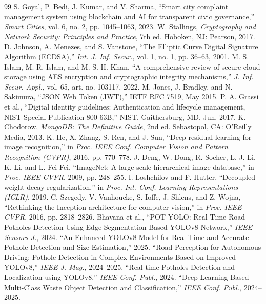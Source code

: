 \documentclass[conference]{IEEEtran}
\begin{document}
\begin{thebibliography}{99}
 S. Goyal, P. Bedi, J. Kumar, and V. Sharma, ``Smart city complaint management system using blockchain and AI for transparent civic governance,'' \emph{Smart Cities}, vol. 6, no. 2, pp. 1045--1063, 2023.
 W. Stallings, \emph{Cryptography and Network Security: Principles and Practice}, 7th ed. Hoboken, NJ: Pearson, 2017.
 D. Johnson, A. Menezes, and S. Vanstone, ``The Elliptic Curve Digital Signature Algorithm (ECDSA),'' \emph{Int. J. Inf. Secur.}, vol. 1, no. 1, pp. 36--63, 2001.
 M. S. Islam, M. R. Islam, and M. S. H. Khan, ``A comprehensive review of secure cloud storage using AES encryption and cryptographic integrity mechanisms,'' \emph{J. Inf. Secur. Appl.}, vol. 65, art. no. 103117, 2022.
 M. Jones, J. Bradley, and N. Sakimura, ``JSON Web Token (JWT),'' IETF RFC 7519, May 2015.
 P. A. Grassi et al., ``Digital identity guidelines: Authentication and lifecycle management, NIST Special Publication 800-63B,'' NIST, Gaithersburg, MD, Jun. 2017.
 K. Chodorow, \emph{MongoDB: The Definitive Guide}, 2nd ed. Sebastopol, CA: O'Reilly Media, 2013.
 K. He, X. Zhang, S. Ren, and J. Sun, ``Deep residual learning for image recognition,'' in \emph{Proc. IEEE Conf. Computer Vision and Pattern Recognition (CVPR)}, 2016, pp. 770--778.
 J. Deng, W. Dong, R. Socher, L.-J. Li, K. Li, and L. Fei-Fei, ``ImageNet: A large-scale hierarchical image database,'' in \emph{Proc. IEEE CVPR}, 2009, pp. 248--255.
 I. Loshchilov and F. Hutter, ``Decoupled weight decay regularization,'' in \emph{Proc. Int. Conf. Learning Representations (ICLR)}, 2019.
 C. Szegedy, V. Vanhoucke, S. Ioffe, J. Shlens, and Z. Wojna, ``Rethinking the Inception architecture for computer vision,'' in \emph{Proc. IEEE CVPR}, 2016, pp. 2818--2826.
 Bhavana et al., ``POT-YOLO: Real-Time Road Potholes Detection Using Edge Segmentation-Based YOLOv8 Network,'' \emph{IEEE Sensors J.}, 2024.
 ``An Enhanced YOLOv8 Model for Real-Time and Accurate Pothole Detection and Size Estimation,'' 2025.
 ``Road Perception for Autonomous Driving: Pothole Detection in Complex Environments Based on Improved YOLOv8,'' \emph{IEEE J. Mag.}, 2024--2025.
 ``Real-time Potholes Detection and Localization using YOLOv8,'' \emph{IEEE Conf. Publ.}, 2024.
 ``Deep Learning Based Multi-Class Waste Object Detection and Classification,'' \emph{IEEE Conf. Publ.}, 2024--2025.

\end{thebibliography}
\end{document}
